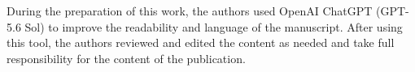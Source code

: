 During the preparation of this work, the authors used OpenAI ChatGPT (GPT-5.6 Sol) to improve the readability and language of the manuscript. After using this tool, the authors reviewed and edited the content as needed and take full responsibility for the content of the publication.
